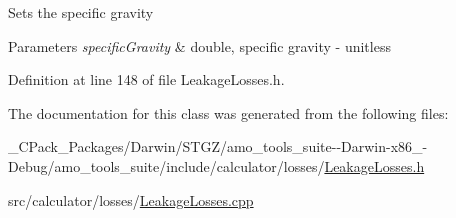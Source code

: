 Sets the specific gravity 
\begin{DoxyParams}{Parameters}
{\em specific\+Gravity} & double, specific gravity -\/ unitless \\
\hline
\end{DoxyParams}


Definition at line 148 of file Leakage\+Losses.\+h.



The documentation for this class was generated from the following files\+:\begin{DoxyCompactItemize}
\item 
\+\_\+\+C\+Pack\+\_\+\+Packages/\+Darwin/\+S\+T\+G\+Z/amo\+\_\+tools\+\_\+suite-\/-\/\+Darwin-\/x86\+\_-\/\+Debug/amo\+\_\+tools\+\_\+suite/include/calculator/losses/\hyperlink{___c_pack___packages_2_darwin_2_s_t_g_z_2amo__tools__suite--_darwin-x86__64-_debug_2amo__tools__be1c2deea7260b8efc944b7eabd016c5}{Leakage\+Losses.\+h}\item 
src/calculator/losses/\hyperlink{_leakage_losses_8cpp}{Leakage\+Losses.\+cpp}\end{DoxyCompactItemize}
